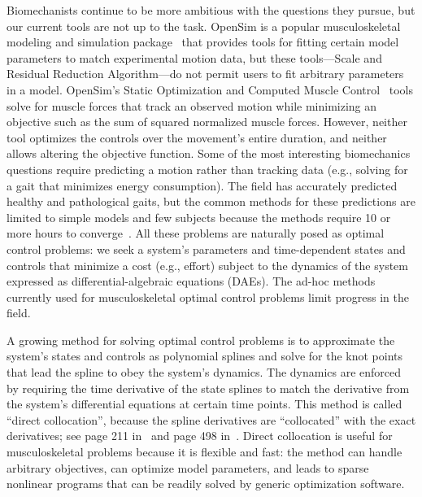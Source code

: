 \documentclass[10pt,letterpaper]{article}
\begin{document}
Biomechanists continue to be more ambitious with the questions they pursue, but our current tools are not up to the task. OpenSim is a popular musculoskeletal modeling and simulation package~\cite{Delp:2007ij,Seth:2011hya,Seth:2018gg} that provides tools for fitting certain model parameters to match experimental motion data, but these tools—Scale and Residual Reduction Algorithm—do not permit users to fit arbitrary parameters in a model. OpenSim’s Static Optimization and Computed Muscle Control~\cite{Thelen:2003bba} tools solve for muscle forces that track an observed motion while minimizing an objective such as the sum of squared normalized muscle forces. However, neither tool optimizes the controls over the movement’s entire duration, and neither allows altering the objective function. Some of the most interesting biomechanics questions require predicting a motion rather than tracking data (e.g., solving for a gait that minimizes energy consumption). The field has accurately predicted healthy and pathological gaits, but the common methods for these predictions are limited to simple models and few subjects because the methods require 10 or more hours to converge~\cite{Dorn:2015ji,Song:2018ji,Ong:2019TODO}. All these problems are naturally posed as optimal control problems: we seek a system’s parameters and time-dependent states and controls that minimize a cost (e.g., effort) subject to the dynamics of the system expressed as differential-algebraic equations (DAEs). The ad-hoc methods currently used for musculoskeletal optimal control problems limit progress in the field.

A growing method for solving optimal control problems is to approximate the system’s states and controls as polynomial splines and solve for the knot points that lead the spline to obey the system’s dynamics. The dynamics are enforced by requiring the time derivative of the state splines to match the derivative from the system’s differential equations at certain time points. This method is called “direct collocation”, because the spline derivatives are “collocated” with the exact derivatives; see page 211 in~\cite{Hairer:1993} and page 498 in~\cite{Hairer:1996}. Direct collocation is useful for musculoskeletal problems because it is flexible and fast: the method can handle arbitrary objectives, can optimize model parameters, and leads to sparse nonlinear programs that can be readily solved by generic optimization software.
\end{document}
